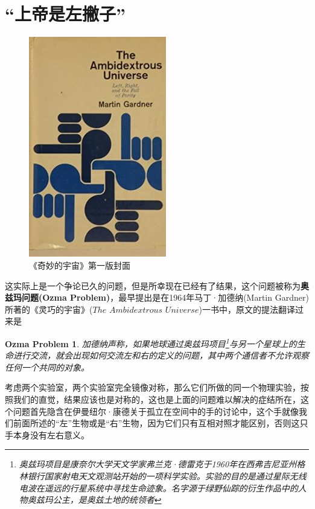 \documentclass[hyperref,UTF8]{ctexart}
\newtheorem*{proposition}{Ozma Problem}
\begin{document}
\section{“上帝是左撇子”}
\begin{figure}[H]
    \centering
    \includegraphics[width=6cm]{TAU.png}
    \caption{《奇妙的宇宙》第一版封面}
\end{figure}
这实际上是一个争论已久的问题，但是所幸现在已经有了结果，这个问题被称为\textbf{奥兹玛问题(Ozma Problem)}，最早提出是在1964年马丁·加德纳(Martin Gardner)所著的《灵巧的宇宙》($The$ $Ambidextrous$ $Universe$)一书中，原文的提法翻译过来是
\begin{proposition}
    加德纳声称，如果地球通过奥兹玛项目\footnote{奥兹玛项目是康奈尔大学天文学家弗兰克·德雷克于1960年在西弗吉尼亚州格林银行国家射电天文观测站开始的一项科学实验。实验的目的是通过星际无线电波在遥远的行星系统中寻找生命迹象。名字源于绿野仙踪的衍生作品中的人物奥兹玛公主，是奥兹土地的统领者}与另一个星球上的生命进行交流，就会出现如何交流左和右的定义的问题，其中两个通信者不允许观察任何一个共同的对象。
\end{proposition}
考虑两个实验室，两个实验室完全镜像对称，那么它们所做的同一个物理实验，按照我们的直觉，结果应该也是对称的，这也是上面的问题难以解决的症结所在，这个问题首先隐含在伊曼纽尔·康德关于孤立在空间中的手的讨论中，这个手就像我们前面所述的“左”生物或是“右”生物，因为它们只有互相对照才能区别，否则这只手本身没有左右意义。
\end{document}
